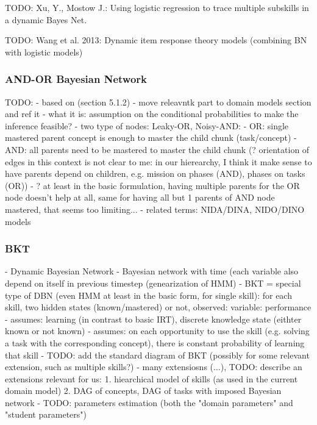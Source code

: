 TODO: Xu, Y., Mostow J.: Using logistic regression to trace multiple subskills in a dynamic Bayes Net.

TODO: Wang et al. 2013: Dynamic item response theory models
(combining BN with logistic models)

\subsubsection{AND-OR Bayesian Network}

TODO:
- based on \cite{student-models-review-2012} (section 5.1.2)
- move releavntk part to domain models section and ref it
- what it is: assumption on the conditional probabilities to make the inference feasible?
- two type of nodes: Leaky-OR, Noisy-AND:
  - OR: single mastered parent concept is enough to master the child chunk (task/concept)
  - AND: all parents need to be mastered to master the child chunk
  (? orientation of edges in this context is not clear to me: in our hierearchy,
  I think it make sense to have parents depend on children, e.g. mission on
  phases (AND), phases on tasks (OR))
- ? at least in the basic formulation, having multiple parents for the OR node doesn't help
  at all, same for having all but 1 parents of AND node mastered, that seems too limiting...
- related terms: NIDA/DINA, NIDO/DINO models


\subsubsection{BKT}

- Dynamic Bayesian Network - Bayesian network with time (each variable also
  depend on itself in previous timestep (genearization of HMM)
- BKT = special type of DBN (even HMM at least in the basic form, for single skill):
  for each skill, two hidden states (known/mastered) or not,
  observed: variable: performance
- assumes: learning (in contrast to basic IRT), discrete knowledge state (eithter known or not known)
- assumes: on each opportunity to use the skill (e.g. solving a task with the corresponding concept), there is constant probability of learning that skill
- TODO: add the standard diagram of BKT (possibly for some relevant extension, such as multiple skills?)
- many extensiosns (...), TODO: describe an extensions relevant for us:
1. hiearchical model of skills (as used in the current domain model)
2. DAG of concepts, DAG of tasks with imposed Bayesian network
- TODO: parameters estimation (both the "domain parameters" and "student parameters")

